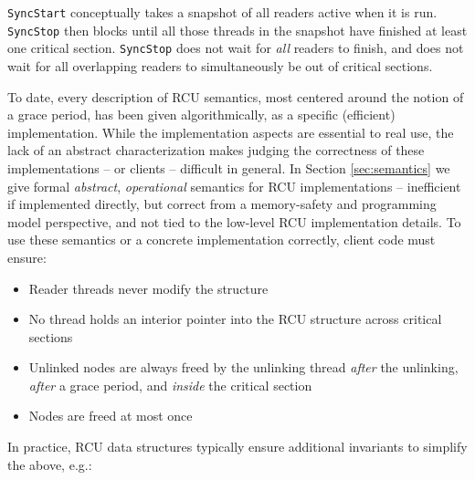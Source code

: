 \lstinline|SyncStart| conceptually takes a snapshot of all readers active when it is run.
\lstinline|SyncStop| then blocks until all those threads in the snapshot have finished at least one critical section.
\lstinline|SyncStop| does not wait for \emph{all} readers to finish, and does not wait for all overlapping readers to simultaneously be out of critical sections.

To date, every description of RCU semantics, most centered around the notion of a grace period, has been given algorithmically, as a specific (efficient) implementation.  While the implementation aspects are essential to real use, the lack of an abstract characterization makes judging the correctness of these implementations -- or clients -- difficult in general. In Section \ref{sec:semantics} we give formal \emph{abstract}, \emph{operational} semantics for RCU implementations -- inefficient if implemented directly, but correct from a memory-safety and programming model perspective, and not tied to the low-level RCU implementation details.
To use these semantics or a concrete implementation correctly, client code must ensure:
\begin{itemize}
\item Reader threads never modify the structure
\item No thread holds an interior pointer into the RCU structure across critical sections
\item Unlinked nodes are always freed by the unlinking thread \emph{after} the unlinking, \emph{after} a grace period, and \emph{inside} the critical section
\item Nodes are freed at most once
\end{itemize}
In practice, RCU data structures typically ensure additional invariants to simplify the above, e.g.:
